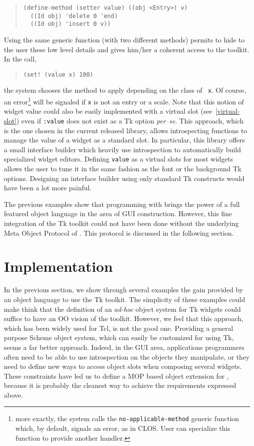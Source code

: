 {\begin{quote}
\begin{verbatim}
(define-method (setter value) ((obj <Entry>) v)
  ((Id obj) 'delete 0 'end)
  ((Id obj) 'insert 0 v))
\end{verbatim}
\end{quote}

Using the same generic function (with two different methods) permits to
hide to the user these low level details and gives him/her a coherent
access to the toolkit. In the call, {\label{value}}
\begin{quote}{\figsize
\begin{verbatim}
(set! (value x) 100)
\end{verbatim}
}\end{quote}
\noindent
the system chooses the method to apply depending on the class of {\tt
x}. Of course, an error\footnote{more exactly, the system calls the
{\tt no-applicable-method} generic function which, by default, signals
an error, as in CLOS. User can specialize this function to provide
another handler.} will be signaled if {\tt x} is not an
entry or a scale.  Note that this notion of widget value could also be
easily implemented with a virtual slot (see~\ref{virtual-slot}) even
if {\tt :value} does not exist as a Tk option {\it per~se}. This
approach, which is the one chosen in the current released library,
allows introspecting functions to manage the value of a widget as
a standard slot. In particular, this library offers a small interface
builder which heavily use introspection to automatically build
specialized widget editors. Defining {\tt value} as a virtual slots
for most widgets allows the user to tune it in the same fashion as the
font or the background Tk options. Designing an interface builder
using only standard Tk constructs would have been a lot more
painful.


The previous examples show that programming with {\stklos} brings the power
of a full featured object language in the area of GUI
construction. However, this fine integration of the Tk toolkit could not
have been done without the underlying Meta Object Protocol of
{\stklos}. This protocol is discussed in the following section.


\section{Implementation}

In the previous section, we show through several examples the gain provided
by an object language to use the Tk toolkit. The simplicity of these
examples could make think that the definition of an {\em ad-hoc} object
system for Tk widgets could suffice to have an OO vision of the
toolkit. However, we feel that this approach, which has been widely
used for Tcl, is not the good one. Providing a general purpose Scheme
object system, which can easily be customized for using Tk, seems a
far better approach.  Indeed, in the GUI area, applications
programmers often need to be able to use introspection on the objects
they manipulate, or they need to define new ways to access object
slots when composing several widgets. These constraints have led us to
define a MOP based object extension for {\stk}, because it is probably
the cleanest way to achieve the requirements expressed above.

}
